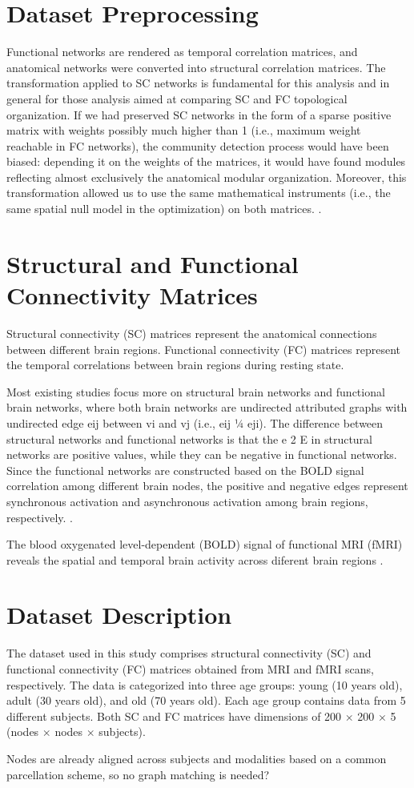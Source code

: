 
\section{Dataset Preprocessing}
Functional networks are rendered as temporal correlation matrices, and anatomical networks were converted into structural 
correlation matrices.
The transformation applied to SC networks is fundamental for this analysis and in general for those analysis aimed at 
comparing SC and FC topological organization. 
If we had preserved SC networks in the form of a sparse positive matrix with
weights possibly much higher than 1 (i.e., maximum weight reachable in FC networks), the community detection process would  
have been biased: depending it on the weights of the matrices, it would have found modules reflecting almost exclusively 
the anatomical modular organization.
Moreover, this transformation allowed us to use the same mathematical instruments (i.e., the same spatial null model in 
the optimization) on both matrices.
\cite{Puxeddu2022}.

\section{Structural and Functional Connectivity Matrices}
Structural connectivity (SC) matrices represent the anatomical connections between different brain regions.
Functional connectivity (FC) matrices represent the temporal correlations between brain regions during resting state.

Most existing studies focus more on structural brain networks 
and functional brain networks, where both brain networks are 
undirected attributed graphs with undirected edge eij between 
vi and vj (i.e., eij ¼ eji). The difference between structural
networks and functional networks is that the e 2 E in structural 
networks are positive values, while they can be negative in 
functional networks.
Since the functional networks are constructed based on the BOLD 
signal correlation among different brain nodes, the positive and 
negative edges represent synchronous activation and asynchronous 
activation among brain regions, respectively. \cite{Tang2023}.

The blood oxygenated level-dependent (BOLD) signal of functional MRI
(fMRI) reveals the spatial and temporal brain activity across diferent
brain regions \cite{Zhao2022}. 

\section{Dataset Description}
The dataset used in this study comprises structural connectivity (SC) and functional connectivity (FC) matrices 
obtained from MRI and fMRI scans, respectively. The data is categorized into three age groups: 
young (10 years old), adult (30 years old), and old (70 years old). Each age group contains data from 5 different subjects.
Both SC and FC matrices have dimensions of 200 $\times$ 200 $\times$ 5 (nodes $\times$ nodes $\times$ subjects).

Nodes are already aligned across subjects and modalities based on a 
common parcellation scheme, so no graph matching is needed? \cite{Puxeddu2022}
